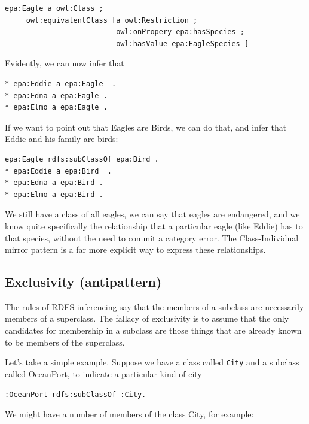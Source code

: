 \begin{lstlisting}
epa:Eagle a owl:Class ;
     owl:equivalentClass [a owl:Restriction ;
                          owl:onPropery epa:hasSpecies ;
                          owl:hasValue epa:EagleSpecies ]
\end{lstlisting}

Evidently, we can now infer that

\begin{lstlisting}
* epa:Eddie a epa:Eagle  .
* epa:Edna a epa:Eagle .
* epa:Elmo a epa:Eagle . 
\end{lstlisting}

If we want to point out that Eagles are Birds, we can do that, and infer that Eddie
and his family are birds:

\begin{lstlisting}
epa:Eagle rdfs:subClassOf epa:Bird .
* epa:Eddie a epa:Bird  .
* epa:Edna a epa:Bird .
* epa:Elmo a epa:Bird . 
\end{lstlisting}

We still have a class of all eagles, we can say that eagles are endangered, and 
we know quite specifically the relationship that a particular eagle (like Eddie) has
to that species, without the need to commit a category error.  The Class-Individual mirror
pattern is a far more explicit way to express these relationships. 







\subsection{Exclusivity (antipattern)}

The rules of RDFS inferencing say that the members of a subclass are
necessarily members of a superclass. The fallacy of exclusivity is to
assume that the only candidates for membership in a subclass are those
things that are already known to be members of the superclass.

Let's take a simple example. Suppose we have a class called \texttt{City} and a
subclass called
OceanPort, to indicate a particular kind of city

\begin{lstlisting}
:OceanPort rdfs:subClassOf :City.
\end{lstlisting}

We might have a number of members of the class City, for example:

